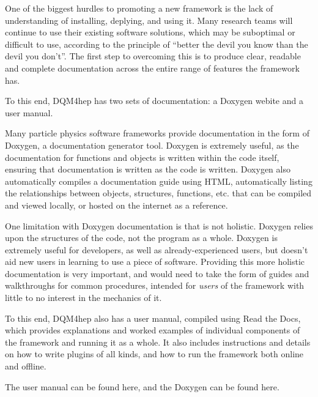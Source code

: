 One of the biggest hurdles to promoting a new framework is the lack of understanding of installing, deplying, and using it. Many research teams will continue to use their existing software solutions, which may be suboptimal or difficult to use, according to the principle of ``better the devil you know than the devil you don't''. The first step to overcoming this is to produce clear, readable and complete documentation across the entire range of features the framework has.

To this end, DQM4hep has two sets of documentation: a Doxygen webite and a user manual.

Many particle physics software frameworks provide documentation in the form of Doxygen, a documentation generator tool. Doxygen is extremely useful, as the documentation for functions and objects is written within the code itself, ensuring that documentation is written as the code is written. Doxygen also automatically compiles a documentation guide using HTML, automatically listing the relationships between objects, structures, functions, etc. that can be compiled and viewed locally, or hosted on the internet as a reference.

One limitation with Doxygen documentation is that is not holistic. Doxygen relies upon the structures of the code, not the program as a whole. Doxygen is extremely useful for developers, as well as already-experienced users, but doesn't aid new users in learning to use a piece of software. Providing this more holistic documentation is very important, and would need to take the form of guides and walkthroughs for common procedures, intended for \emph{users} of the framework with little to no interest in the mechanics of it.

To this end, DQM4hep also has a user manual, compiled using Read the Docs, which provides explanations and worked examples of individual components of the framework and running it as a whole. It also includes instructions and details on how to write plugins of all kinds, and how to run the framework both online and offline. 

The user manual can be found here\cite{dqm4hep-user-manual}, and the Doxygen can be found here\cite{dqm4hep-doxygen}.
